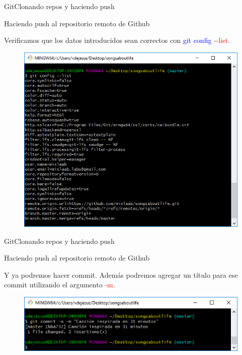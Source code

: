 \documentclass[10pt]{beamer}
\begin{document}
\begin{frame}{Git}{Clonando repos y haciendo push}

\begin{block}{Haciendo push al repositorio remoto de Github}

Verificamos que los datos introducidos sean correctos con \textcolor{blue}{git config} \textcolor{red}{-{}-list.}

\begin{figure}[h!]
\centering
\includegraphics [scale=0.44]{configlist}
\label{fig:configlist}
\end{figure}

\end{block}

\end{frame}

\begin{frame}{Git}{Clonando repos y haciendo push}

\begin{block}{Haciendo push al repositorio remoto de Github}

Y ya podremos hacer commit. Además podremos agregar un título para ese commit utilizando el argumento \textcolor{red}{-m}.

\begin{figure}[h!]
\centering
\includegraphics [scale=0.6]{gitcommit2}
\label{fig:gitcommit2}
\end{figure}

\end{block}

\end{frame}
\end{document}
